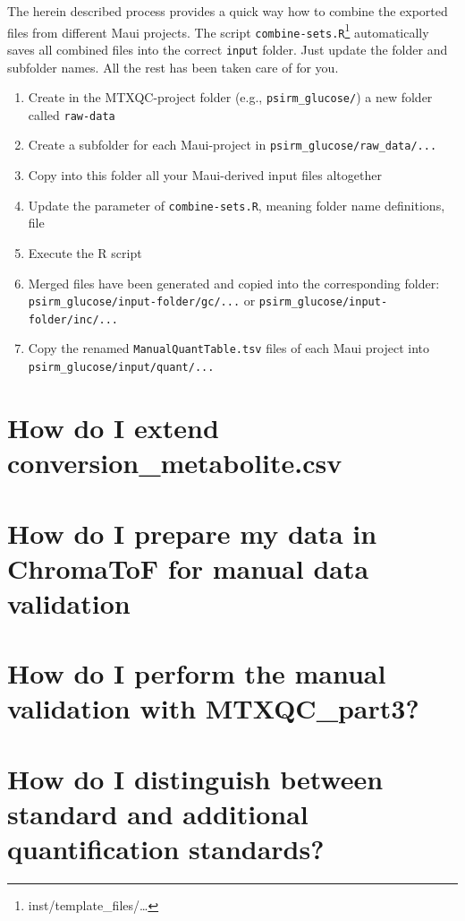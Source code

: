 \documentclass[]{book}
\providecommand{\tightlist}{%
  \setlength{\itemsep}{0pt}\setlength{\parskip}{0pt}}
\let\rmarkdownfootnote\footnote%
\def\footnote{\protect\rmarkdownfootnote}
\theoremstyle{definition}
\theoremstyle{definition}
\theoremstyle{definition}
\theoremstyle{remark}
\begin{document}
The herein described process provides a quick way how to combine the
exported files from different Maui projects. The script
\texttt{combine-sets.R}\footnote{inst/template\_files/\ldots{}}
automatically saves all combined files into the correct \texttt{input}
folder. Just update the folder and subfolder names. All the rest has
been taken care of for you.

\begin{enumerate}
\def\labelenumi{\arabic{enumi}.}
\tightlist
\item
  Create in the MTXQC-project folder (e.g., \texttt{psirm\_glucose/}) a
  new folder called \texttt{raw-data}
\item
  Create a subfolder for each Maui-project in
  \texttt{psirm\_glucose/raw\_data/...}
\item
  Copy into this folder all your Maui-derived input files altogether
\item
  Update the parameter of \texttt{combine-sets.R}, meaning folder name
  definitions, file
\item
  Execute the R script
\item
  Merged files have been generated and copied into the corresponding
  folder: \texttt{psirm\_glucose/input-folder/gc/...} or
  \texttt{psirm\_glucose/input-folder/inc/...}
\item
  Copy the renamed \texttt{ManualQuantTable.tsv} files of each Maui
  project into \texttt{psirm\_glucose/input/quant/...}
\end{enumerate}

\section{How do I extend conversion\_metabolite.csv}\label{extendconse}

\section{How do I prepare my data in ChromaToF for manual data
validation}\label{howmanval-chroma}

\section{How do I perform the manual validation with
MTXQC\_part3?}\label{howmanval-part3}

\section{How do I distinguish between standard and additional
quantification standards?}\label{quantquant}
\end{document}
